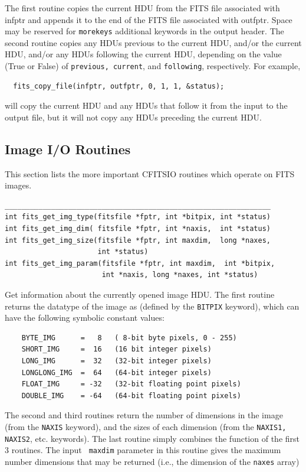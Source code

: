 \documentclass[11pt]{article}
\begin{document}
The first routine copies the current HDU from the FITS file associated
with infptr and appends it to the end of the FITS file associated with
outfptr.  Space may be reserved for {\tt morekeys} additional keywords
in the output header.   The second routine copies any HDUs previous
to the current HDU, and/or the current HDU, and/or any HDUs following the
current HDU, depending on the value (True or False) of {\tt previous,
current}, and {\tt following}, respectively.  For example,
\begin{verbatim}
  fits_copy_file(infptr, outfptr, 0, 1, 1, &status);
\end{verbatim}
will copy the current HDU and any HDUs that follow it from the input
to the output file, but it will not copy any HDUs preceding the
current HDU.


\newpage
\subsection{Image I/O Routines}

This section lists the more important CFITSIO routines which operate on
FITS images.

\begin{verbatim}
_______________________________________________________________
int fits_get_img_type(fitsfile *fptr, int *bitpix, int *status)
int fits_get_img_dim( fitsfile *fptr, int *naxis,  int *status)
int fits_get_img_size(fitsfile *fptr, int maxdim,  long *naxes,
                      int *status)
int fits_get_img_param(fitsfile *fptr, int maxdim,  int *bitpix,
                       int *naxis, long *naxes, int *status)
\end{verbatim}

Get information about the currently opened image HDU. The first routine
returns the datatype of the image as (defined by the {\tt BITPIX}
keyword), which can have the following symbolic constant values:
\begin{verbatim}
    BYTE_IMG      =   8   ( 8-bit byte pixels, 0 - 255)
    SHORT_IMG     =  16   (16 bit integer pixels)
    LONG_IMG      =  32   (32-bit integer pixels)
    LONGLONG_IMG  =  64   (64-bit integer pixels)
    FLOAT_IMG     = -32   (32-bit floating point pixels)
    DOUBLE_IMG    = -64   (64-bit floating point pixels)
\end{verbatim}

The second and third routines return the number of dimensions in the
image (from the {\tt NAXIS} keyword), and the sizes of each dimension
(from the {\tt NAXIS1, NAXIS2}, etc. keywords).  The last routine
simply combines the function of the first 3 routines.  The input {\tt
maxdim} parameter in this routine gives the maximum number dimensions
that may be returned (i.e., the dimension of the {\tt naxes}
array)
\end{document}
